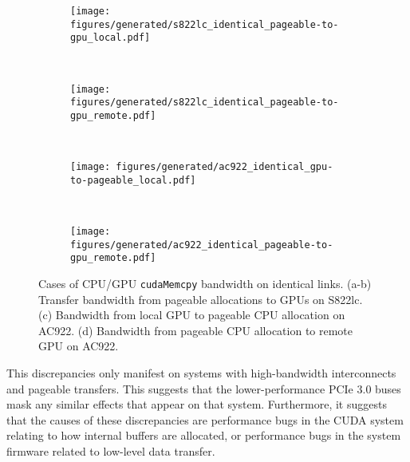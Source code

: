 \begin{figure}[ht]
	\centering
	\begin{subfigure}[b]{0.31\textwidth}
		\texttt{[image: figures/generated/s822lc\_identical\_pageable-to-gpu\_local.pdf]}
		\caption{}
		\label{fig:explicit-identical-s822lc-local}
	\end{subfigure}
	~
	\begin{subfigure}[b]{0.31\textwidth}
		\texttt{[image: figures/generated/s822lc\_identical\_pageable-to-gpu\_remote.pdf]}
		\caption{}
		\label{fig:explicit-identical-s822lc-remote}
	\end{subfigure}
	\\
	\begin{subfigure}[b]{0.31\textwidth}
		\texttt{[image: figures/generated/ac922\_identical\_gpu-to-pageable\_local.pdf]}
		\caption{}
		\label{fig:explicit-identical-ac922-local}
	\end{subfigure}
	~
	\begin{subfigure}[b]{0.31\textwidth}
		\texttt{[image: figures/generated/ac922\_identical\_pageable-to-gpu\_remote.pdf]}
		\caption{}
		\label{fig:explicit-identical-ac922-remote}
	\end{subfigure}
	\caption[CPU/GPU \texttt{cudaMemcpy} bandwidth on identical links]{
		Cases of CPU/GPU \texttt{cudaMemcpy} bandwidth on identical links.
		(a-b) Transfer bandwidth from pageable allocations to GPUs on S822lc.
		(c) Bandwidth from local GPU to pageable CPU allocation on AC922.
		(d) Bandwidth from pageable CPU allocation to remote GPU on AC922.
	}
	\label{fig:explicit-identical}
\end{figure}

This discrepancies only manifest on systems with high-bandwidth interconnects and pageable transfers.
This suggests that the lower-performance PCIe 3.0 buses mask any similar effects that appear on that system.
Furthermore, it suggests that the causes of these discrepancies are performance bugs in the CUDA system relating to how internal buffers are allocated, or performance bugs in the system firmware related to low-level data transfer.

